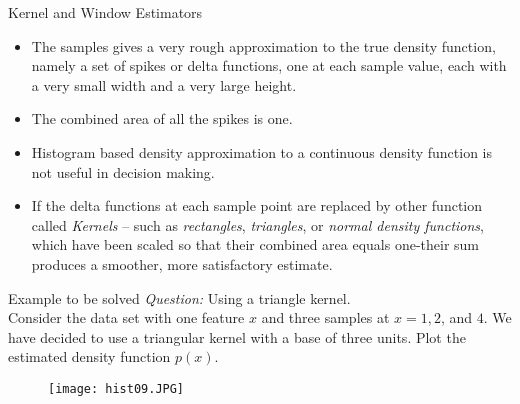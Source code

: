 \begin{frame}{Kernel and Window Estimators}
\begin{itemize}
\item The samples gives a very rough approximation to the true density function, namely a set of spikes or delta functions, one at each sample value, each with a very small width and a very large height.
\item The combined area of all the spikes is one.
\item Histogram based density approximation to  a continuous density function is not useful in decision making.
\item If the delta functions at each sample point are replaced by other function called \textit{\color{mycolor2}Kernels} -- such as \textit{\color{mycolor2}rectangles}, \textit{\color{mycolor2}triangles}, or \textit{\color{mycolor2}normal density functions}, which have been scaled so that their combined area equals one-their sum produces a smoother, more satisfactory estimate.
\end{itemize}
\end{frame}

\begin{frame}{Example to be solved}
\textit{\color{mycolor1}Question:} Using a triangle kernel.\\
Consider the data set with one feature $x$ and three samples at $x=1,2$, and $4$. We have decided to use a triangular kernel with a base of three units. Plot the estimated density function $p(x)$.%
\begin{figure}
\texttt{[image: hist09.JPG]}
\end{figure}
\end{frame}


